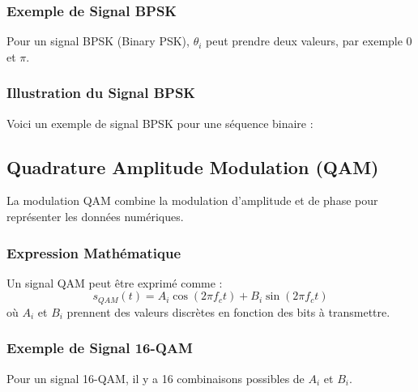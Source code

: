 \documentclass[10pt,a4paper]{article}
\begin{document}
\subsubsection*{Exemple de Signal BPSK}
Pour un signal BPSK (Binary PSK), \( \theta_i \) peut prendre deux valeurs, par exemple 0 et \( \pi \).

\subsubsection*{Illustration du Signal BPSK}
Voici un exemple de signal BPSK pour une séquence binaire :


\subsection*{Quadrature Amplitude Modulation (QAM)}
La modulation QAM combine la modulation d'amplitude et de phase pour représenter les données numériques.

\subsubsection*{Expression Mathématique}
Un signal QAM peut être exprimé comme :
\[ s_{QAM}(t) = A_i \cos(2\pi f_c t) + B_i \sin(2\pi f_c t) \]
où \( A_i \) et \( B_i \) prennent des valeurs discrètes en fonction des bits à transmettre.

\subsubsection*{Exemple de Signal 16-QAM}
Pour un signal 16-QAM, il y a 16 combinaisons possibles de \( A_i \) et \( B_i \).
\end{document}
